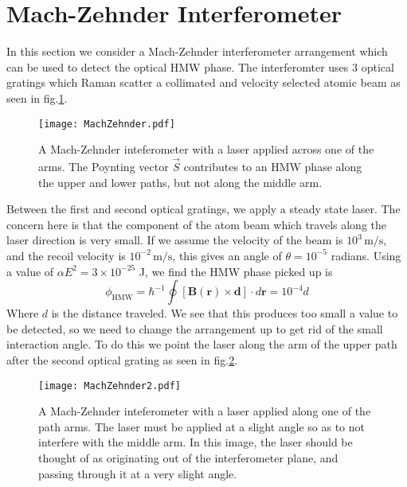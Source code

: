 \documentclass[twocolumn,english,pra,aps,superscriptaddress,floatfix]{revtex4-1}
\begin{document}
\section{Mach-Zehnder Interferometer}
\label{sec:mach}
In this section we consider a Mach-Zehnder interferometer arrangement which can be used to detect the optical HMW phase.  The interferomter uses 3 optical gratings which Raman scatter a collimated and velocity selected atomic beam as seen in fig.\ref{fig:mach}.  
\begin{figure}
\texttt{[image: MachZehnder.pdf]}
\caption{A Mach-Zehnder inteferometer with a laser applied across one of the arms. The Poynting vector $\vec{S}$ contributes to an HMW phase along the upper and lower paths, but not along the middle arm.} 
\label{fig:mach}
\end{figure}
Between the first and second optical gratings, we apply a steady state laser.  The concern here is that the component of the atom beam which travels along the laser direction is very small.  If we assume the velocity of the beam is $10^3\,\mathrm{m/s}$, and the recoil velocity is $10^{-2}\,\mathrm{m/s}$, this gives an angle of $\theta=10^{-5}$ radians.  Using a value of $\alpha E^2=3\times 10^{-25}$ J, we find the HMW phase picked up is 
\begin{equation}
\phi_{\mathrm{HMW}} = \hbar^{-1} \oint [\mathbf{B}(\mathbf{r}) \times \mathbf {d}] \cdot d \mathbf r =10^{-4}d
\end{equation}
Where $d$ is the distance traveled.  We see that this produces too small a value to be detected, so we need to change the arrangement up to get rid of the small interaction angle.  To do this we point the laser along the arm of the upper path after the second optical grating as seen in fig.\ref{fig:mach2}. 
\begin{figure}
\texttt{[image: MachZehnder2.pdf]}
\caption{A Mach-Zehnder inteferometer with a laser applied along one of the path arms.  The laser must be applied at a slight angle so as to not interfere with the middle arm.  In this image, the laser should be thought of as originating out of the interferometer plane, and passing through it at a very slight angle.} 
\label{fig:mach2}
\end{figure}
\end{document}
